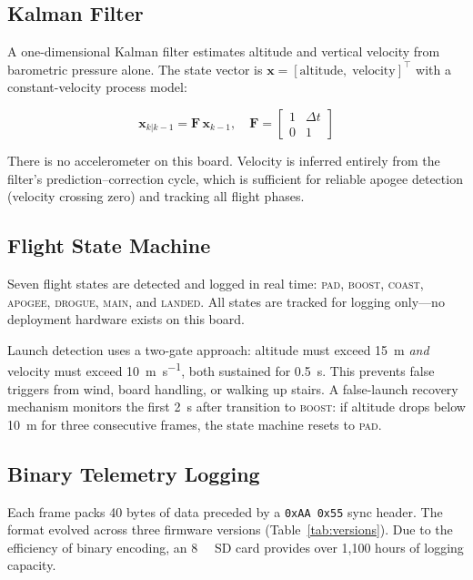 \documentclass[11pt, a4paper]{article}
\begin{document}
\subsection{Kalman Filter}

A one-dimensional Kalman filter estimates altitude and vertical velocity from barometric pressure alone. The state vector is $\mathbf{x} = [\text{altitude},\; \text{velocity}]^\top$ with a constant-velocity process model:

\vspace{-0.5em}
\begin{equation}
    \mathbf{x}_{k|k-1} = \mathbf{F}\,\mathbf{x}_{k-1}, \quad
    \mathbf{F} = \begin{bmatrix} 1 & \Delta t \\ 0 & 1 \end{bmatrix}
\end{equation}

There is no accelerometer on this board. Velocity is inferred entirely from the filter's prediction--correction cycle, which is sufficient for reliable apogee detection (velocity crossing zero) and tracking all flight phases.

\subsection{Flight State Machine}

Seven flight states are detected and logged in real time: \textsc{pad}, \textsc{boost}, \textsc{coast}, \textsc{apogee}, \textsc{drogue}, \textsc{main}, and \textsc{landed}. All states are tracked for logging only---no deployment hardware exists on this board.

Launch detection uses a two-gate approach: altitude must exceed \SI{15}{\metre} \textit{and} velocity must exceed \SI{10}{\metre\per\second}, both sustained for \SI{0.5}{\second}. This prevents false triggers from wind, board handling, or walking up stairs. A false-launch recovery mechanism monitors the first \SI{2}{\second} after transition to \textsc{boost}: if altitude drops below \SI{10}{\metre} for three consecutive frames, the state machine resets to \textsc{pad}.

\subsection{Binary Telemetry Logging}

Each frame packs 40 bytes of data preceded by a \texttt{0xAA\,0x55} sync header. The format evolved across three firmware versions (Table~\ref{tab:versions}). Due to the efficiency of binary encoding, an \SI{8}{\giga\byte} SD card provides over 1,100 hours of logging capacity.
\end{document}
